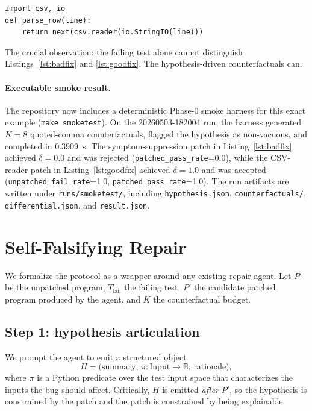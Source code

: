 \documentclass[sigconf,review,anonymous,nonacm]{acmart}
\begin{document}
\begin{lstlisting}[caption={A patch that survives counterfactual
auditing.},label={lst:goodfix}]
import csv, io
def parse_row(line):
    return next(csv.reader(io.StringIO(line)))
\end{lstlisting}

The crucial observation: the failing test alone cannot distinguish
Listings~\ref{lst:badfix} and \ref{lst:goodfix}. The hypothesis-driven
counterfactuals can.

\paragraph{Executable smoke result.} The repository now includes a
deterministic Phase-0 smoke harness for this exact example
(\texttt{make smoketest}). On the 20260503-182004 run, the harness
generated $K=8$ quoted-comma counterfactuals, flagged the hypothesis as
non-vacuous, and completed in 0.3909~s. The symptom-suppression patch
in Listing~\ref{lst:badfix} achieved $\delta=0.0$ and was rejected
(\texttt{patched\_pass\_rate}=0.0), while the CSV-reader patch in
Listing~\ref{lst:goodfix} achieved $\delta=1.0$ and was accepted
(\texttt{unpatched\_fail\_rate}=1.0,
\texttt{patched\_pass\_rate}=1.0). The run artifacts are written under
\texttt{runs/smoketest/}, including \texttt{hypothesis.json},
\texttt{counterfactuals/}, \texttt{differential.json}, and
\texttt{result.json}.

\section{Self-Falsifying Repair}
\label{sec:approach}

We formalize the protocol as a wrapper around any existing repair
agent. Let $P$ be the unpatched program, $T_{\text{fail}}$ the failing
test, $P'$ the candidate patched program produced by the agent, and $K$
the counterfactual budget.

\subsection{Step 1: hypothesis articulation}
We prompt the agent to emit a structured object
\[
H = \big(\text{summary},\, \pi : \text{Input} \to \mathbb{B},\,
\text{rationale}\big),
\]
where $\pi$ is a Python predicate over the test input space that
characterizes the inputs the bug should affect. Critically, $H$ is
emitted \emph{after} $P'$, so the hypothesis is constrained by the
patch and the patch is constrained by being explainable.
\end{document}
